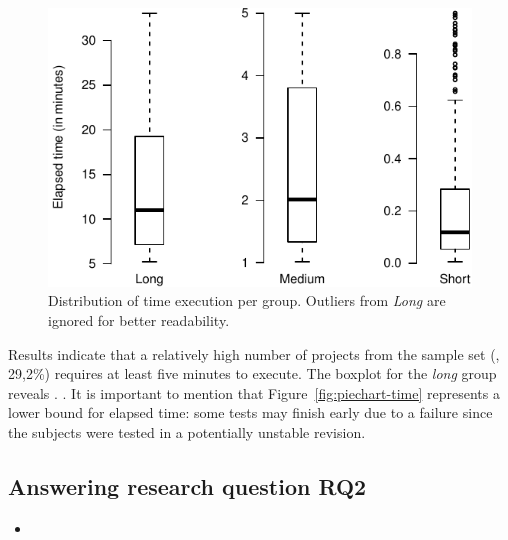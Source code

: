 \begin{figure}[h!]
    \centering
    \begin{minipage}{2.5in}%
    \includegraphics[width=\textwidth]{plots/boxplots-timecost.pdf}
    \end{minipage}%
    \caption{\label{fig:boxplots-time} Distribution of time execution
    per group. Outliers from \emph{Long} are ignored for better
    readability.}
\end{figure}

Results indicate that a relatively high number of projects from the
sample set (\ie, 29,2\%) requires at least five minutes to execute.
The boxplot for the \emph{long} group reveals . .  It is important to mention that
Figure~\ref{fig:piechart-time} represents a lower bound for elapsed
time: some tests may finish early due to a failure since the subjects
were tested in a potentially unstable revision.

\subsection{Answering research question RQ2}
\label{sec:rqTwo}

\begin{itemize}
    \item \emph{\RQB}
\end{itemize}

